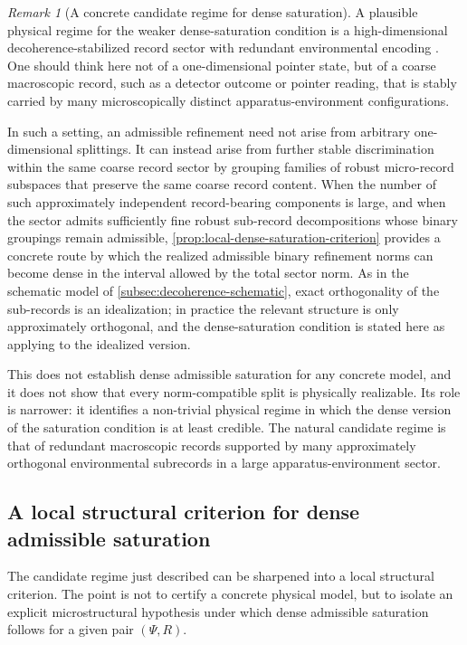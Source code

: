 \documentclass[11pt]{article}
\theoremstyle{remark}
\newtheorem{remark}{Remark}
\numberwithin{equation}{section}
\begin{document}
\begin{remark}[A concrete candidate regime for dense saturation]
A plausible physical regime for the weaker dense-saturation condition is a high-dimensional decoherence-stabilized record sector with redundant environmental encoding \cite{OllivierPoulinZurek2004,Zurek2009QuantumDarwinism}. One should think here not of a one-dimensional pointer state, but of a coarse macroscopic record, such as a detector outcome or pointer reading, that is stably carried by many microscopically distinct apparatus-environment configurations.

In such a setting, an admissible refinement need not arise from arbitrary one-dimensional splittings. It can instead arise from further stable discrimination within the same coarse record sector by grouping families of robust micro-record subspaces that preserve the same coarse record content. When the number of such approximately independent record-bearing components is large, and when the sector admits sufficiently fine robust sub-record decompositions whose binary groupings remain admissible, \cref{prop:local-dense-saturation-criterion} provides a concrete route by which the realized admissible binary refinement norms can become dense in the interval allowed by the total sector norm. As in the schematic model of \cref{subsec:decoherence-schematic}, exact orthogonality of the sub-records is an idealization; in practice the relevant structure is only approximately orthogonal, and the dense-saturation condition is stated here as applying to the idealized version.

This does not establish dense admissible saturation for any concrete model, and it does not show that every norm-compatible split is physically realizable. Its role is narrower: it identifies a non-trivial physical regime in which the dense version of the saturation condition is at least credible. The natural candidate regime is that of redundant macroscopic records supported by many approximately orthogonal environmental subrecords in a large apparatus-environment sector.
\end{remark}

\subsection{A local structural criterion for dense admissible saturation}

The candidate regime just described can be sharpened into a local
structural criterion. The point is not to certify a concrete physical
model, but to isolate an explicit microstructural hypothesis under
which dense admissible saturation follows for a given pair
\((\Psi,R)\).
\end{document}

